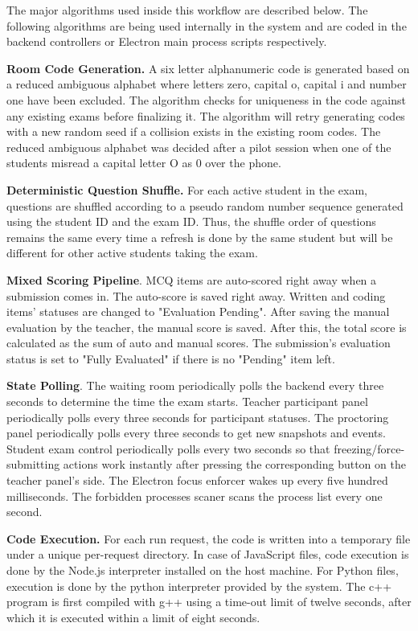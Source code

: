 \documentclass[12pt, a4paper]{report}
\begin{document}
\begin{justify}
  {\fontsize{12}{18}\selectfont
    The major algorithms used inside this workflow are described below. The following algorithms are being used internally in the system and are coded in the backend controllers or Electron main process scripts respectively.

    \textbf{Room Code Generation.} A six letter alphanumeric code is generated based on a reduced ambiguous alphabet where letters zero, capital o, capital i and number one have been excluded. The algorithm checks for uniqueness in the code against any existing exams before finalizing it. The algorithm will retry generating codes with a new random seed if a collision exists in the existing room codes. The reduced ambiguous alphabet was decided after a pilot session when one of the students misread a capital letter O as 0 over the phone.

    \textbf{Deterministic Question Shuffle.} For each active student in the exam, questions are shuffled according to a pseudo random number sequence generated using the student ID and the exam ID. Thus, the shuffle order of questions remains the same every time a refresh is done by the same student but will be different for other active students taking the exam.

    \textbf{Mixed Scoring Pipeline}. MCQ items are auto-scored right away when a submission comes in. The auto-score is saved right away. Written and coding items' statuses are changed to "Evaluation Pending". After saving the manual evaluation by the teacher, the manual score is saved. After this, the total score is calculated as the sum of auto and manual scores. The submission's evaluation status is set to "Fully Evaluated" if there is no "Pending" item left.

    \textbf{State Polling}. The waiting room periodically polls the backend every three seconds to determine the time the exam starts. Teacher participant panel periodically polls every three seconds for participant statuses. The proctoring panel periodically polls every three seconds to get new snapshots and events. Student exam control periodically polls every two seconds so that freezing/force-submitting actions work instantly after pressing the corresponding button on the teacher panel's side. The Electron focus enforcer wakes up every five hundred milliseconds. The forbidden processes scaner scans the process list every one second.

    \textbf{Code Execution.} For each run request, the code is written into a temporary file under a unique per-request directory. In case of JavaScript files, code execution is done by the Node.js interpreter installed on the host machine. For Python files, execution is done by the python interpreter provided by the system. The c++ program is first compiled with g++ using a time-out limit of twelve seconds, after which it is executed within a limit of eight seconds. 

}
\end{justify}
\end{document}
